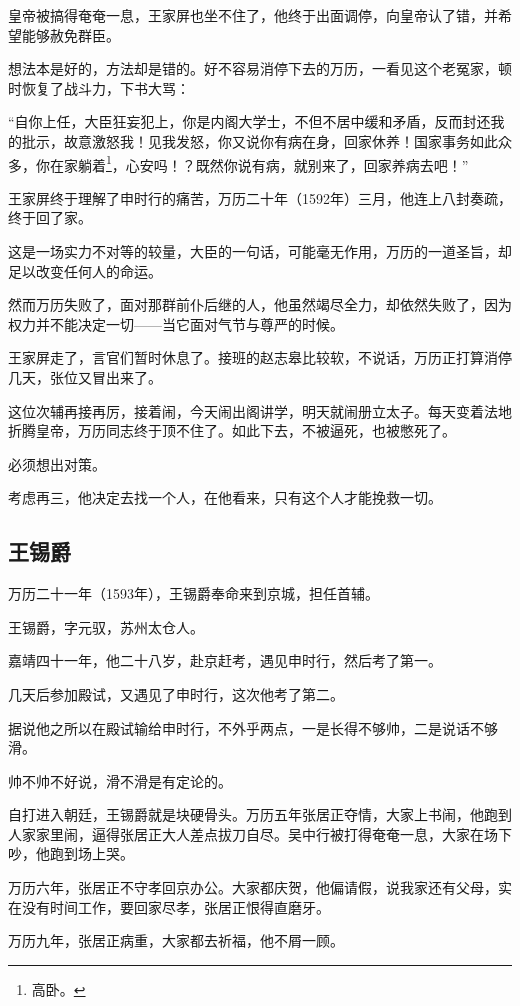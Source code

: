 \begin{multicols}{\theparacolNo}
		皇帝被搞得奄奄一息，王家屏也坐不住了，他终于出面调停，向皇帝认了错，并希望能够赦免群臣。

		想法本是好的，方法却是错的。好不容易消停下去的万历，一看见这个老冤家，顿时恢复了战斗力，下书大骂：

		“自你上任，大臣狂妄犯上，你是内阁大学士，不但不居中缓和矛盾，反而封还我的批示，故意激怒我！见我发怒，你又说你有病在身，回家休养！国家事务如此众多，你在家躺着\footnote{高卧。}，心安吗！？既然你说有病，就别来了，回家养病去吧！”

		王家屏终于理解了申时行的痛苦，万历二十年（1592年）三月，他连上八封奏疏，终于回了家。

		这是一场实力不对等的较量，大臣的一句话，可能毫无作用，万历的一道圣旨，却足以改变任何人的命运。

		然而万历失败了，面对那群前仆后继的人，他虽然竭尽全力，却依然失败了，因为权力并不能决定一切——当它面对气节与尊严的时候。

		王家屏走了，言官们暂时休息了。接班的赵志皋比较软，不说话，万历正打算消停几天，张位又冒出来了。

		这位次辅再接再厉，接着闹，今天闹出阁讲学，明天就闹册立太子。每天变着法地折腾皇帝，万历同志终于顶不住了。如此下去，不被逼死，也被憋死了。

		必须想出对策。

		考虑再三，他决定去找一个人，在他看来，只有这个人才能挽救一切。

		\subsection{王锡爵}
		万历二十一年（1593年），王锡爵奉命来到京城，担任首辅。

		王锡爵，字元驭，苏州太仓人。

		嘉靖四十一年，他二十八岁，赴京赶考，遇见申时行，然后考了第一。

		几天后参加殿试，又遇见了申时行，这次他考了第二。

		据说他之所以在殿试输给申时行，不外乎两点，一是长得不够帅，二是说话不够滑。

		帅不帅不好说，滑不滑是有定论的。

		自打进入朝廷，王锡爵就是块硬骨头。万历五年张居正夺情，大家上书闹，他跑到人家家里闹，逼得张居正大人差点拔刀自尽。吴中行被打得奄奄一息，大家在场下吵，他跑到场上哭。

		万历六年，张居正不守孝回京办公。大家都庆贺，他偏请假，说我家还有父母，实在没有时间工作，要回家尽孝，张居正恨得直磨牙。

		万历九年，张居正病重，大家都去祈福，他不屑一顾。


\end{multicols}
